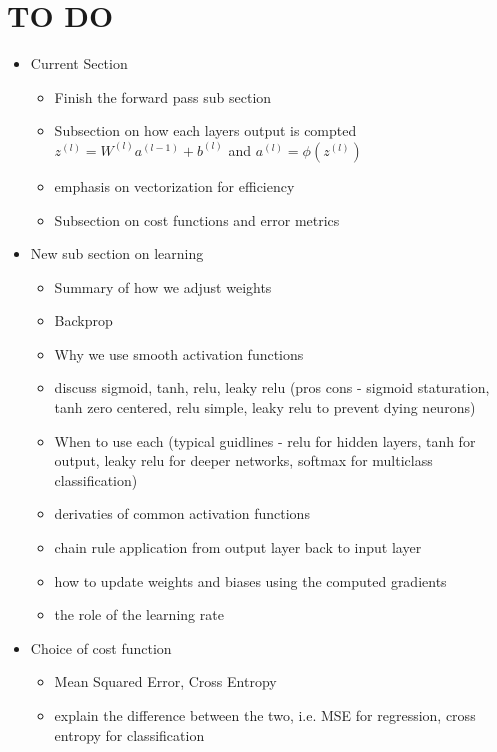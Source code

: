 \documentclass[9pt]{extarticle}
\theoremstyle{plain}
\theoremstyle{definition}
\theoremstyle{remark}
\begin{document}
\pagebreak
\section{TO DO}
\scriptsize
\begin{itemize}
    \item Current Section
          \begin{itemize}
              \item Finish the forward pass  sub section
              \item Subsection on how  each layers output is compted $z^{(l)} = W^{(l)}a^{(l-1)} + b^{(l)}$ and $a^{(l)} = \phi(z^{(l)})$
              \item emphasis on vectorization for efficiency
              \item Subsection on cost functions and error metrics
          \end{itemize}
    \item New sub section on learning
          \begin{itemize}
              \item Summary of how we adjust weights
              \item Backprop
              \item Why we use smooth activation functions
              \item discuss sigmoid, tanh, relu, leaky relu (pros cons - sigmoid staturation, tanh zero centered, relu simple, leaky relu to prevent dying neurons)
              \item When to use each (typical guidlines - relu for hidden layers, tanh for output, leaky relu for deeper networks, softmax for multiclass classification)
              \item  derivaties of common activation functions
              \item chain rule application from output layer back to input layer
              \item how to update weights and biases using the computed gradients
              \item the role of the learning rate
          \end{itemize}
    \item Choice of cost function
          \begin{itemize}
              \item Mean Squared Error, Cross Entropy
              \item explain the difference between the two, i.e. MSE for regression, cross entropy for classification
          \end{itemize}


\end{itemize}
\end{document}
